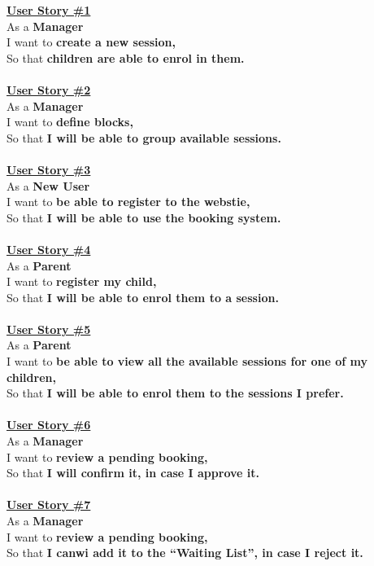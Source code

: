 \documentclass{l3proj}
\begin{document}
\textbf{\underline{User Story \#1}}\\
As a \textbf{Manager}\\
I want to \textbf{create a new session,}\\
So that \textbf{children are able to enrol in them.}\\
\\
\textbf{\underline{User Story \#2}}\\
As a \textbf{Manager}\\
I want to \textbf{define blocks,}\\
So that \textbf{I will be able to group available sessions.}\\
\\
\textbf{\underline{User Story \#3}}\\
As a \textbf{New User}\\
I want to \textbf{be able to register to the webstie,}\\
So that \textbf{I will be able to use the booking system.}\\
\\
\textbf{\underline{User Story \#4}}\\
As a \textbf{Parent}\\
I want to \textbf{register my child,}\\
So that \textbf{I will be able to enrol them to a session.}\\
\\
\textbf{\underline{User Story \#5}}\\
As a \textbf{Parent}\\
I want to \textbf{be able to view all the available sessions for one of my children,}\\
So that \textbf{I will be able to enrol them to the sessions I prefer.}\\
\\
\textbf{\underline{User Story \#6}}\\
As a \textbf{Manager}\\
I want to \textbf{review a pending booking,}\\
So that \textbf{I will confirm it, in case I approve it.}\\
\\
\textbf{\underline{User Story \#7}}\\
As a \textbf{Manager}\\
I want to \textbf{review a pending booking,}\\
So that \textbf{I canwi add it to the “Waiting List”, in case I reject it.}\\
\end{document}

